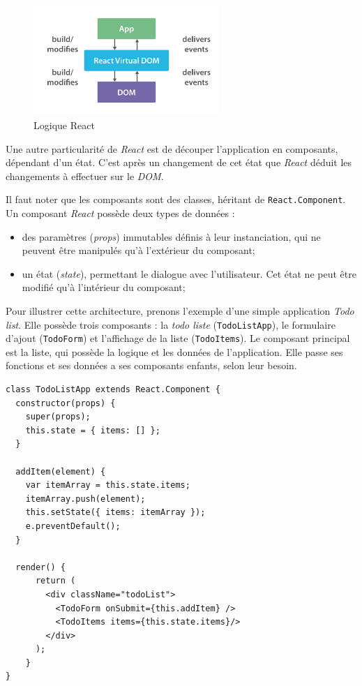 \bigskip

\begin{figure}[h]
  \centering
  \includegraphics[width=7cm]{figures/react-map.png}
  \caption{Logique React}
\end{figure}

\bigskip

Une autre particularité de \emph{React} est de découper l'application en
composants, dépendant d'un état. C'est après un changement de cet état
que \emph{React} déduit les changements à effectuer sur le \emph{DOM}.

\bigskip

Il faut noter que les composants sont des classes, héritant de
\texttt{React.Component}. Un composant \emph{React} possède deux types
de données :

\begin{itemize}
\tightlist
\item
  des paramètres (\emph{props}) immutables définis à leur instanciation,
  qui ne peuvent être manipulés qu'à l'extérieur du composant;
\item
  un état (\emph{state}), permettant le dialogue avec l'utilisateur. Cet
  état ne peut être modifié qu'à l'intérieur du composant;
\end{itemize}

\bigskip

Pour illustrer cette architecture, prenons l'exemple d'une simple
application \emph{Todo list}. Elle possède trois composants : la
\emph{todo liste} (\texttt{TodoListApp}), le formulaire d'ajout
(\texttt{TodoForm}) et l'affichage de la liste (\texttt{TodoItems}). Le
composant principal est la liste, qui possède la logique et les données
de l'application. Elle passe ses fonctions et ses données a ses
composants enfants, selon leur besoin.

\begin{verbatim}
class TodoListApp extends React.Component {
  constructor(props) {
    super(props);
    this.state = { items: [] };
  }

  addItem(element) {
    var itemArray = this.state.items;
    itemArray.push(element);
    this.setState({ items: itemArray });
    e.preventDefault();
  }

  render() {
      return (
        <div className="todoList">
          <TodoForm onSubmit={this.addItem} />
          <TodoItems items={this.state.items}/>
        </div>
      );
    }
}
\end{verbatim}

